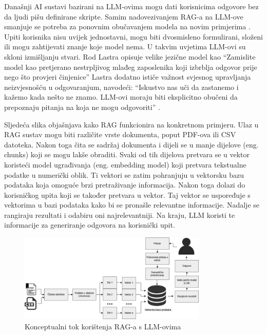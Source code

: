 \documentclass[]{foi}
\begin{document}
Današnji AI sustavi bazirani na LLM-ovima mogu dati korisnicima odgovore bez da ljudi pišu definirane skripte. Samim nadovezivanjem RAG-a na LLM-ove smanjuje se potreba za ponovnim obučavanjem 
modela na novim primjerima \cite{ibmRAG}. Upiti korisnika nisu uvijek jednostavni, mogu biti dvosmisleno formulirani, složeni ili mogu zahtijevati znanje koje model nema. U takvim uvjetima 
LLM-ovi su skloni izmišljanju stvari. Rod Lastra opisuje velike jezične model kao “Zamislite model kao pretjerano nestrpljivog mlađeg zaposlenika koji izbrblja odgovor prije nego što provjeri činjenice”
Lastra dodatno ističe važnost svjesnog upravljanja neizvjesnošću u odgovaranjum, navodeći: “Iskustvo nas uči da zastanemo i kažemo kada nešto ne znamo. LLM-ovi moraju biti eksplicitno obučeni da prepoznaju pitanja na koja ne mogu odgovoriti” \cite{ibmRAG}. 

Sljedeća slika objašnjava kako RAG funkcionira na konkretnom primjeru. Ulaz u RAG sustav mogu biti različite vrste dokumenta, poput PDF-ova ili CSV datoteka. Nakon toga čita se 
sadržaj dokumenta i dijeli se u manje dijelove (eng. chunks) koji se mogu lakše obraditi. Svaki od tih dijelova pretvara se u vektor koristeći model ugrađivanja (eng. embedding model)
koji pretvara tekstualne podatke u numerički oblik. Ti vektori se zatim pohranjuju u vektorsku bazu podataka koja omoguće brzi pretraživanje informacija. Nakon toga dolazi do korisničkog
upita koji se također pretvara u vektor. Taj vektor se uspoređuje s vektorima u bazi podataka kako bi se pronašle relevantne informacije. Nadalje se rangiraju rezultati i odabiru oni
najrelevantniji. Na kraju, LLM koristi te informacije za generiranje odgovora na korisnički upit.

\begin{figure}[ht!]
    \centering
    \includegraphics[width=0.8\textwidth]{./assets/rag_diagram.png} 
    \caption{Konceptualni tok korištenja RAG-a s LLM-ovima \cite{awsRAG2025}}
    \label{fig:slika1}
\end{figure}
\end{document}
